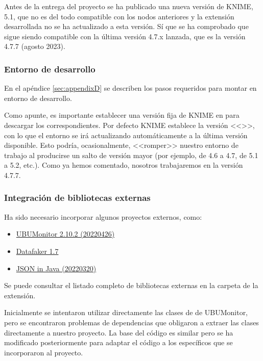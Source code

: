 Antes de la entrega del proyecto se ha publicado una nueva versión de KNIME, 5.1, que no es del todo compatible 
con los nodos anteriores y la extensión desarrollada no se ha actualizado a esta versión. Sí que se ha comprobado que 
sigue siendo compatible con la última versión 4.7.x lanzada, que es la versión 4.7.7 (agosto 2023).

\subsubsection{Entorno de desarrollo}

En el apéndice \ref{sec:appendixD} se describen los pasos requeridos para montar en entorno de desarrollo. 

Como apunte, es importante establecer una versión fija de KNIME en  para descargar los  
correspondientes. Por defecto KNIME establece la versión <<>>, con lo que el entorno se irá actualizando automáticamente a la última versión disponible. 
Esto podría, ocasionalmente, <<romper>> nuestro entorno de trabajo al producirse un salto de versión mayor (por ejemplo, de 4.6 a 4.7, de 5.1 a 5.2, etc.). 
Como ya hemos comentado, nosotros trabajaremos en la versión 4.7.7.


\subsubsection{Integración de bibliotecas externas}

Ha sido necesario incorporar algunos proyectos externos, como:

\begin{itemize}
	\item \href{https://github.com/yjx0003/UBUMonitor/releases}{UBUMonitor 2.10.2 (20220426)}
	\item \href{https://www.datafaker.net/releases/1.7.0/}{Datafaker 1.7}
	\item \href{https://github.com/stleary/JSON-java}{JSON in Java (20220320)}
\end{itemize}

Se puede consultar el listado completo de bibliotecas externas en la carpeta  de la extensión. 
\

Inicialmente se intentaron utilizar directamente las clases de  de UBUMonitor, pero se 
encontraron problemas de dependencias que obligaron a extraer las clases directamente a nuestro proyecto. 
La base del código es similar pero se ha modificado posteriormente para adaptar el código a los  específicos que se incorporaron al proyecto. 

